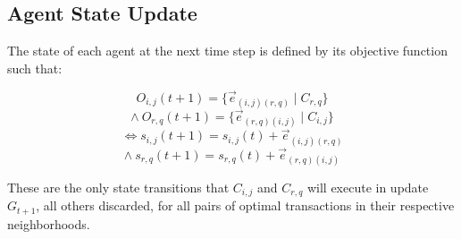 \documentclass[12pt]{article}
\begin{document}
\subsection{Agent State Update}

The state of each agent at the next time step is defined by its objective function such that:

  \[
    O_{i,j}(t+1) = \{\vec{e}_{(i,j) (r,q)} \mid C_{r,q}\}
  \]
  \[
  \land \ O_{r,q}(t+1) = \{\vec{e}_{(r,q) (i,j)} \mid C_{i,j}\}
  \]
  \[
  \iff s_{i,j}(t+1) = s_{i,j}(t) + \vec{e}_{(i,j) (r,q)}
  \]
  \[
  \land \ s_{r,q}(t+1) = s_{r,q}(t) + \vec{e}_{(r,q) (i,j)} \tag{4.1.1}
  \]
  
These are the only state transitions that $C_{i,j}$ and $C_{r,q}$ will execute in update $G_{t+1}$, all others discarded, for all pairs of optimal transactions in their respective neighborhoods.
\end{document}
